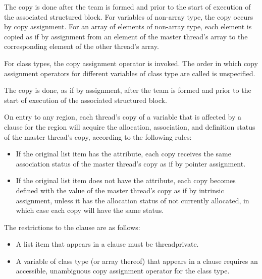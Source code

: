 \descr
\ccppspecificstart
The copy is done after the team is formed and prior to the start of execution of the 
associated structured block. For variables of non-array type, the copy occurs by copy 
assignment. For an array of elements of non-array type, each element is copied as if by 
assignment from an element of the master thread’s array to the corresponding element of 
the other thread’s array. 
\ccppspecificend

\cppspecificstart
For class types, the copy assignment operator is invoked. The order in which copy 
assignment operators for different variables of class type are called is unspecified. 
\cppspecificend

\fortranspecificstart
The copy is done, as if by assignment, after the team is formed and prior to the start of 
execution of the associated structured block.

On entry to any  region, each thread’s copy of a variable that is affected by 
a  clause for the  region will acquire the allocation, association, and 
definition status of the master thread’s copy, according to the following rules:

\begin{itemize}
\item If the original list item has the  attribute, each copy receives the same 
association status of the master thread’s copy as if by pointer assignment.

\item If the original list item does not have the  attribute, each copy becomes 
defined with the value of the master thread's copy as if by intrinsic assignment, 
unless it has the allocation status of not currently allocated, in which case each copy 
will have the same status.
\end{itemize}
\fortranspecificend

\restrictions
The restrictions to the  clause are as follows:
\ccppspecificstart
\begin{itemize}
\item A list item that appears in a  clause must be threadprivate.

\item A variable of class type (or array thereof) that appears in a  clause requires 
an accessible, unambiguous copy assignment operator for the class type.
\end{itemize}
\ccppspecificend

